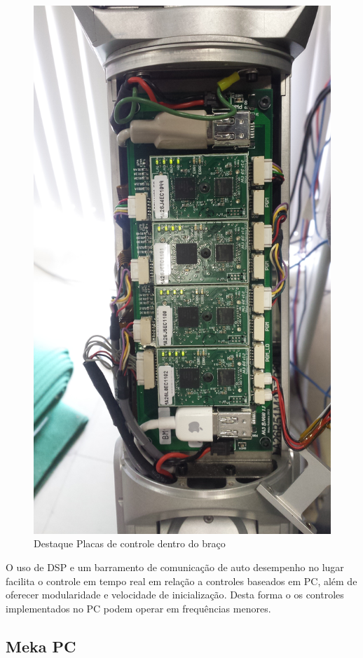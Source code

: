 \begin{figure}[H]
    \centering
    \includegraphics[width = 0.8\linewidth]{figs/dsp-control-wrist}
    \caption{Destaque Placas de controle dentro do braço}
    \label{fig:dsp-control-wrist}
\end{figure}

O uso de DSP e um barramento de comunicação de auto desempenho no lugar facilita o controle em tempo real em relação a controles baseados em PC, além de oferecer modularidade e velocidade de inicialização\cite{edsinger2004domo}. Desta forma o os controles implementados no PC podem operar em frequências menores.


\subsection{Meka PC}

